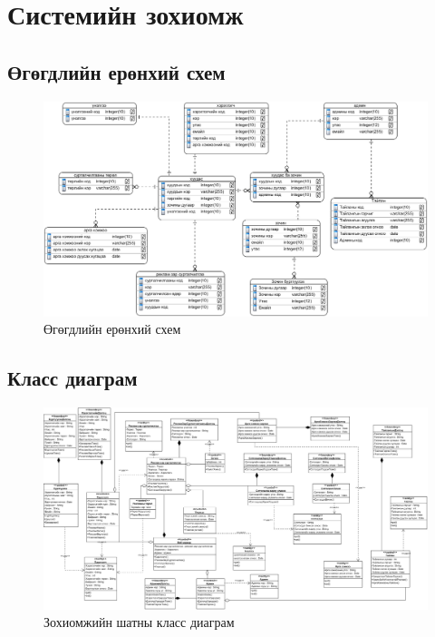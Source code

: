 
\chapter{Системийн зохиомж} %
\label{Chapter3} %

	\section{Өгөгдлийн ерөнхий схем}
		\begin{figure}[ht]
			\includegraphics[width=27cm,angle=90,scale=0.7]{Diagrams/Entity}
			\caption[Өгөгдлийн ерөнхий схем]{Өгөгдлийн ерөнхий схем}
			\label{text}
		\end{figure}

\section{Класс диаграм}
	\begin{figure}[ht]
		\includegraphics[angle=90,scale=0.34]{Diagrams/z_class}
		\caption[Зохиомжийн шатны класс диаграм]{Зохиомжийн шатны класс диаграм}
		\label{text}
	\end{figure}
